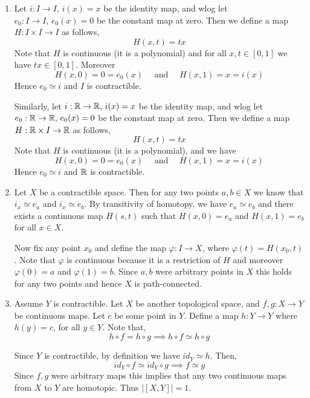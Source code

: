 \documentclass[12pt]{article}
\begin{document}
\begin{solution}
    \bbni
    \begin{enumerate}
        \item Let $i: I \to I, \, i(x) = x$ be the identity map, and wlog let $e_{0}: I \to I, \, e_0(x) = 0$ be the constant map at zero. Then we define a map $H:I \times I \to I$ as follows, 
        \[H(x,t) = tx\]
        Note that $H$ is continuous (it is a polynomial) and for all $x, t \in [0,1]$ we have $tx \in [0,1]$. Moreover \[H(x, 0) = 0 = e_0(x) \quad \text{ and } \quad H(x, 1) = x = i(x)\] Hence $e_0 \simeq i$ and $I$ is contractible. 

        \bbni 

        Similarly, let $i: \mathbb R \to \mathbb R, \, i(x) = x$ be the identity map, and wlog let $e_{0}: \mathbb R \to \mathbb R, \,  e_0(x) = 0$ be the constant map at zero. Then we define a map $H:\mathbb R \times I \to \mathbb R$ as follows, 
        \[H(x,t) = tx\]
        Note that $H$ is continuous (it is a polynomial), and we have
        \[H(x, 0) = 0 = e_0(x) \quad \text{ and } \quad H(x, 1) = x = i(x)\]
        Hence $e_0 \simeq i$ and $\mathbb R$ is contractible. 

        \item Let $X$ be a contractible space. Then for any two points $a, b \in X$ we know that $i_x \simeq e_a$ and $i_x \simeq e_b$. By transitivity of homotopy, we have $e_a \simeq e_b$ and there exists a continuous map $H(s,t)$ such that $H(x, 0) = e_a$ and $H(x, 1) = e_b$ for all $x \in X$. 
        
        Now fix any point $x_0$ and define the map $\varphi: I \to X$, where $\varphi(t) = H(x_0, t)$. Note that $\varphi$ is continuous because it is a restriction of $H$ and moreover $\varphi(0) = a$ and $\varphi(1) = b$. Since $a, b$ were arbitrary points in $X$ this holds for any two points and hence $X$ is path-connected. 
        
        \item Assume $Y$ is contractible. Let $X$ be another topological space, and $f, g: X \to Y$ be continuous maps. Let $c$ be some point in $Y$. Define a map $h: Y \to Y$ where $h(y) = c$, for all $y \in Y$. Note that, 
        \[h \circ f = h \circ g \implies h \circ f \simeq h \circ g\]

        Since $Y$ is contractible, by definition we have $id_Y \simeq h$. Then, 
        \[id_Y \circ f \simeq id_Y \circ g \implies f \simeq g\]
        Since $f,g$ were arbitrary maps this implies that any two continuous maps from $X$ to $Y$ are homotopic. Thus $|[X,Y]| = 1$.


\end{enumerate}
\end{solution}
\end{document}
